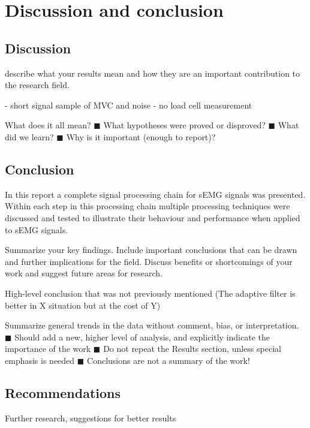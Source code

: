 \chapter{Discussion and conclusion}
\section{Discussion}


describe what your results mean and how they are an important contribution to the research field.

- short signal sample of MVC and noise
- no load cell measurement


What does it all mean?
◼ What hypotheses were proved or disproved?
◼ What did we learn?
◼ Why is it important (enough to report)?
\section{Conclusion}
In this report a complete signal processing chain for sEMG signals was presented. Within each step in this processing chain multiple processing techniques were discussed and tested to illustrate their behaviour and performance when applied to sEMG signals. 



Summarize your key findings. Include important conclusions that can be drawn and further implications for the field. Discuss benefits or shortcomings of your work and suggest future areas for research.

High-level conclusion that was not previously mentioned (The adaptive filter is better in X situation but at the cost of Y)

Summarize general trends in the data without comment, bias, or interpretation.
◼ Should add a new, higher level of analysis, and explicitly indicate the importance
of the work
◼ Do not repeat the Results section, unless special emphasis is needed
◼ Conclusions are not a summary of the work!

\section{Recommendations}
Further research, suggestions for better results